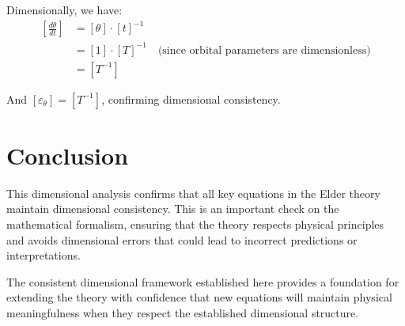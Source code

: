 Dimensionally, we have:
\begin{align}
\left[ \frac{d\theta}{dt} \right] &= [\theta] \cdot [t]^{-1} \\
&= [1] \cdot [T]^{-1} \quad \text{(since orbital parameters are dimensionless)} \\
&= [T^{-1}]
\end{align}

And $[\varepsilon_{\theta}] = [T^{-1}]$, confirming dimensional consistency.

\section{Conclusion}

This dimensional analysis confirms that all key equations in the Elder theory maintain dimensional consistency. This is an important check on the mathematical formalism, ensuring that the theory respects physical principles and avoids dimensional errors that could lead to incorrect predictions or interpretations.

The consistent dimensional framework established here provides a foundation for extending the theory with confidence that new equations will maintain physical meaningfulness when they respect the established dimensional structure.